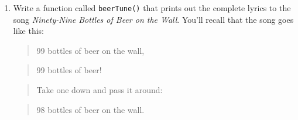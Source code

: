 \documentclass[]{book}
\makeatletter
\newenvironment{Shaded}{\begin{snugshade}}{\end{snugshade}}
\newcommand{\KeywordTok}[1]{\textcolor[rgb]{0.13,0.29,0.53}{\textbf{#1}}}
\newcommand{\DataTypeTok}[1]{\textcolor[rgb]{0.13,0.29,0.53}{#1}}
\newcommand{\DecValTok}[1]{\textcolor[rgb]{0.00,0.00,0.81}{#1}}
\newcommand{\StringTok}[1]{\textcolor[rgb]{0.31,0.60,0.02}{#1}}
\newcommand{\NormalTok}[1]{#1}
\providecommand{\tightlist}{%
  \setlength{\itemsep}{0pt}\setlength{\parskip}{0pt}}
\newenvironment{kframe}{%
\medskip{}
\setlength{\fboxsep}{.8em}
 \def\at@end@of@kframe{}%
 \ifinner\ifhmode%
  \def\at@end@of@kframe{\end{minipage}}%
  \begin{minipage}{\columnwidth}%
 \fi\fi%
 \def\FrameCommand##1{\hskip\@totalleftmargin \hskip-\fboxsep
 \colorbox{shadecolor}{##1}\hskip-\fboxsep
     \hskip-\linewidth \hskip-\@totalleftmargin \hskip\columnwidth}%
 \MakeFramed {\advance\hsize-\width
   \@totalleftmargin\z@ \linewidth\hsize
   \@setminipage}}%
 {\par\unskip\endMakeFramed%
 \at@end@of@kframe}
\renewenvironment{Shaded}{\begin{kframe}}{\end{kframe}}
\theoremstyle{definition}
\theoremstyle{definition}
\theoremstyle{definition}
\theoremstyle{remark}
\makeatother
\begin{document}
{\begin{enumerate}
  The function should take two arguments:

  \begin{itemize}
  \tightlist
  \item
    \texttt{char}: the character to repeat. The default value should be
    \texttt{"*"}.
  \item
    \texttt{n}: the number of characters in the longest, middle line.
    The default value should be 3.
  \end{itemize}

  Typical examples of use should be as follows:

\begin{Shaded}
\begin{Highlighting}[]
\KeywordTok{pattern}\NormalTok{()}
\end{Highlighting}
\end{Shaded}

\begin{verbatim}
## *
## **
## ***
## **
## *
\end{verbatim}

\begin{Shaded}
\begin{Highlighting}[]
\KeywordTok{pattern}\NormalTok{(}\DataTypeTok{char =} \StringTok{"y"}\NormalTok{, }\DataTypeTok{n =} \DecValTok{5}\NormalTok{)}
\end{Highlighting}
\end{Shaded}

\begin{verbatim}
## y
## yy
## yyy
## yyyy
## yyyyy
## yyyy
## yyy
## yy
## y
\end{verbatim}
\item
  Write a function called \texttt{beerTune()} that prints out the
  complete lyrics to the song \emph{Ninety-Nine Bottles of Beer on the
  Wall}. You'll recall that the song goes like this:

  \begin{quote}
  99 bottles of beer on the wall,
  \end{quote}

  \begin{quote}
  99 bottles of beer!
  \end{quote}

  \begin{quote}
  Take one down and pass it around:
  \end{quote}

  \begin{quote}
  98 bottles of beer on the wall.
  \end{quote}


\end{enumerate}}
\end{document}
